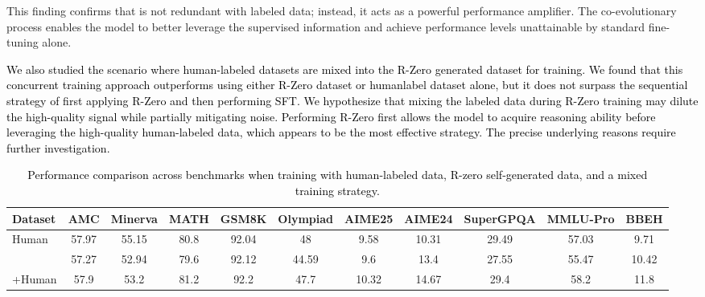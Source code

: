 This finding confirms that \method{} is not redundant with labeled data; instead, it acts as a powerful performance amplifier. The co-evolutionary process enables the model to better leverage the supervised information and achieve performance levels unattainable by standard fine-tuning alone.

\textcolor{black}{
We also studied the scenario where human-labeled datasets are mixed into the R-Zero generated dataset for training. 
We found that this concurrent training approach outperforms using either R-Zero dataset or humanlabel dataset alone, 
but it does not surpass the sequential strategy of first applying R-Zero and then performing SFT. 
We hypothesize that mixing the labeled data during R-Zero training may dilute the high-quality signal while partially mitigating noise. 
Performing R-Zero first allows the model to acquire reasoning ability before leveraging the high-quality human-labeled data, 
which appears to be the most effective strategy. 
The precise underlying reasons require further investigation.}
\begin{table}[h!]
\tiny
\centering
{}
{\color{black}
\begin{tabular}{lcccccccccc}
\toprule
Dataset & AMC & Minerva & MATH & GSM8K & Olympiad & AIME25 & AIME24 & SuperGPQA & MMLU-Pro & BBEH \\
\midrule
Human          & 57.97 & 55.15 & 80.8  & 92.04 & 48    & 9.58  & 10.31 & 29.49 & 57.03 & 9.71  \\
\method{}      & 57.27 & 52.94 & 79.6  & 92.12 & 44.59 & 9.6   & 13.4  & 27.55 & 55.47 & 10.42 \\
\method{}+Human & 57.9  & 53.2  & 81.2  & 92.2  & 47.7  & 10.32 & 14.67 & 29.4  & 58.2  & 11.8  \\
\bottomrule
\end{tabular}
}

\caption{\textcolor{black}{Performance comparison across benchmarks when training with human-labeled data, R-zero self-generated data, and a mixed training strategy.}}
\end{table}










